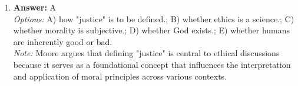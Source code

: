 \documentclass[12pt]{article}
\begin{document}
\begin{enumerate}[label=\arabic*.]
\\ \textit{Note:} Wealth and prosperity have been central focuses of religious traditions in China and Korea due to the Confucian emphasis on social harmony, moral development, and the role of material success in achieving a stable and prosperous society.
\item \textbf{Answer:} A
\\ \textit{Options:} A) how "justice" is to be defined.; B) whether ethics is a science.; C) whether morality is subjective.; D) whether God exists.; E) whether humans are inherently good or bad.
\\ \textit{Note:} Moore argues that defining "justice" is central to ethical discussions because it serves as a foundational concept that influences the interpretation and application of moral principles across various contexts.
\end{enumerate}
\end{document}
